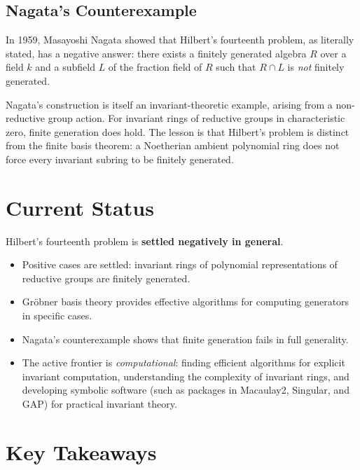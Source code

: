 \subsection{Nagata's Counterexample}

In 1959, Masayoshi Nagata showed that Hilbert's fourteenth problem, as literally stated, has a negative answer: there exists a finitely generated algebra $R$ over a field $k$ and a subfield $L$ of the fraction field of $R$ such that $R \cap L$ is \emph{not} finitely generated.

Nagata's construction is itself an invariant-theoretic example, arising from a non-reductive group action. For invariant rings of reductive groups in characteristic zero, finite generation does hold. The lesson is that Hilbert's problem is distinct from the finite basis theorem: a Noetherian ambient polynomial ring does not force every invariant subring to be finitely generated.

\section{Current Status}

\begin{solvedbox}
Hilbert's fourteenth problem is \textbf{settled negatively in general}.

\begin{itemize}
    \item Positive cases are settled: invariant rings of polynomial representations of reductive groups are finitely generated.
    \item Gr\"obner basis theory provides effective algorithms for computing generators in specific cases.
    \item Nagata's counterexample shows that finite generation fails in full generality.
    \item The active frontier is \emph{computational}: finding efficient algorithms for explicit invariant computation, understanding the complexity of invariant rings, and developing symbolic software (such as packages in Macaulay2, Singular, and GAP) for practical invariant theory.
\end{itemize}
\end{solvedbox}

\section*{Key Takeaways}

